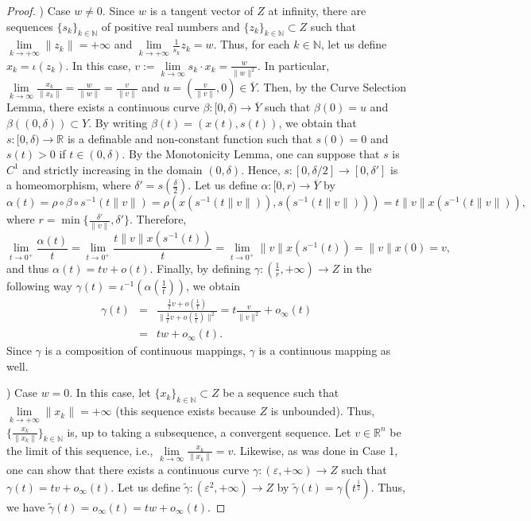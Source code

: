 \documentclass[a4paper,11pt]{amsart}
\newcommand{\R}{\mathbb R}
\newcommand{\N}{\mathbb N}
\begin{document}
\begin{proof}
) Case $w\not=0$. Since $w$ is a tangent vector of $Z$ at infinity, there are sequences $\{s_k\}_{k\in \N}$ of positive real numbers and $\{z_k\}_{k\in \N}\subset Z$ such that $\lim\limits _{k\to +\infty }\|z_k\|=+\infty $ and $\lim\limits _{k\to +\infty }\frac{1}{s_k}z_k=w$. Thus, for each $k\in \N$, let us define $x_k=\iota(z_k)$. In this case,  $v:=\lim\limits _{k\to \infty } s_k\cdot x_k= \frac{w}{\|w\|^2}$. In particular, $\lim\limits _{k\to \infty } \frac{x_k}{\|x_k\|}=\frac{w}{\|w\|}=\frac{v}{\|v\|}$ and $u=(\frac{v}{\|v\|},0)\in \overline{Y}$. Then, by the Curve Selection Lemma, there exists a continuous curve $\beta:[0,\delta)\to \overline{Y}$ such that $\beta(0)=u$ and $\beta((0,\delta ))\subset Y$. By writing $\beta(t)=(x(t),s(t))$, we obtain that $s:[0,\delta )\to \R$ is a definable and non-constant function such that $s(0)=0$ and $s(t)>0$ if $t\in (0,\delta )$. By the Monotonicity Lemma, one can suppose that $s$ is $C^1$ and  strictly increasing in the domain $(0,\delta)$. Hence, $s\colon [0,\delta/2]\to [0,\delta' ]$ is a homeomorphism, where $\delta' =s(\frac{\delta}{2})$. Let us define $\alpha\colon [0,r)\to \overline{Y}$ by
$$
\alpha(t)=\rho\circ \beta\circ s^{-1}(t\|v\|)=\rho(x(s^{-1}(t\|v\|)),s(s^{-1}(t\|v\|)))=t\|v\|x(s^{-1}(t\|v\|)),
$$
where $r=\min\{\frac{\delta'}{\|v\|},\delta'\}$. Therefore,
$$
\lim\limits _{t\to 0^+}\frac{\alpha(t)}{t}=\lim\limits _{t\to 0^+}\frac{t\|v\|x(s^{-1}(t))}{t}=\lim\limits _{t\to 0^+}\|v\|x(s^{-1}(t))=\|v\|x(0)=v,
$$
and thus $\alpha(t)=tv+o(t)$. Finally, by defining $\gamma\colon(\frac{1}{r},+\infty )\to Z$ in the following way $\gamma(t)=\iota^{-1}(\alpha(\frac{1}{t}))$, we obtain
\begin{eqnarray*}
\gamma(t) &=& \frac{\frac{1}{t}v+o(\frac{1}{t})}{\|\frac{1}{t}v+o(\frac{1}{t})\|^2}=t\textstyle{\frac{v}{\|v\|^2}}+o_{\infty }(t)\\
		  &=& tw+o_{\infty }(t).
\end{eqnarray*}
Since $\gamma$ is a composition of continuous mappings,  $\gamma$ is a continuous mapping as well.

\bigskip

) Case $w=0$. In this case,  let $\{x_k\}_{k\in\N}\subset Z$ be a sequence such that  $\lim\limits _{k\to +\infty }\|x_k\|=+\infty $ (this sequence exists because $Z$ is unbounded). Thus, $\{\frac{x_k}{\|x_k\|}\}_{k\in\N}$ is, up to taking a subsequence, a convergent sequence. Let $v\in  \R^n$ be the limit of this sequence, i.e., $\lim\limits _{k\to \infty }\frac{x_k}{\|x_k\|}=v$. Likewise, as was done in Case 1, one can show that there exists a continuous curve $\gamma\colon (\varepsilon,+\infty )\to Z$ such that $\gamma(t)=tv+o_{\infty }(t)$. Let us define $\widetilde\gamma\colon (\varepsilon^{2}, +\infty )\to Z$ by $\widetilde{\gamma}(t)=\gamma(t^{\frac{1}{2}})$. Thus, we have $\widetilde{\gamma}(t)=o_{\infty }(t)=tw+o_{\infty }(t)$.


\end{proof}
\end{document}
